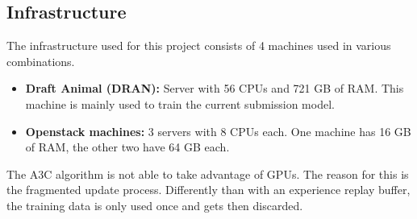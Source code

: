 \subsection*{Infrastructure}\label{infrastructure}
The infrastructure used for this project consists of 4 machines used in various combinations.
\begin{itemize}
	\item \textbf{Draft Animal (DRAN):} Server with 56 CPUs and 721 GB of RAM. This machine is mainly used to train the current submission model.
	\item \textbf{Openstack machines:} 3 servers with 8 CPUs each. One machine has 16 GB of RAM, the other two have 64 GB each.
\end{itemize}
The A3C algorithm is not able to take advantage of GPUs. The reason for this is the fragmented update process. Differently than with an experience replay buffer, the training data is only used once and gets then discarded.
\newpage
